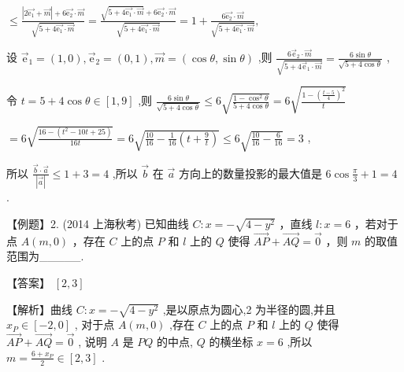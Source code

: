 \documentclass[10pt]{article}
\begin{document}
\(\leq  \frac{\left| {2\overrightarrow{{\mathrm{e}}_{1}} + \overrightarrow{m}}\right|  + 6\overrightarrow{{\mathrm{e}}_{2}} \cdot  \overrightarrow{m}}{\sqrt{5 + 4\overrightarrow{{\mathrm{e}}_{1}} \cdot  \overrightarrow{m}}} = \frac{\sqrt{5 + 4\overrightarrow{{\mathrm{e}}_{1}} \cdot  \overrightarrow{m}} + 6\overrightarrow{{\mathrm{e}}_{2}} \cdot  \overrightarrow{m}}{\sqrt{5 + 4\overrightarrow{{\mathrm{e}}_{1}} \cdot  \overrightarrow{m}}} = 1 + \frac{6\overrightarrow{{\mathrm{e}}_{2}} \cdot  \overrightarrow{m}}{\sqrt{5 + 4\overrightarrow{{\mathrm{e}}_{1}} \cdot  \overrightarrow{m}}},\)

设 \({\overrightarrow{\mathrm{e}}}_{1} = \left( {1,0}\right) ,{\overrightarrow{\mathrm{e}}}_{2} = \left( {0,1}\right) ,\overrightarrow{m} = \left( {\cos \theta ,\sin \theta }\right)\) ,则 \(\frac{6{\overrightarrow{\mathrm{e}}}_{2} \cdot  \overrightarrow{m}}{\sqrt{5 + 4{\overrightarrow{\mathrm{e}}}_{1} \cdot  \overrightarrow{m}}} = \frac{6\sin \theta }{\sqrt{5 + 4\cos \theta }}\) ,

令 \(t = 5 + 4\cos \theta  \in  \left\lbrack  {1,9}\right\rbrack\) ,则 \(\frac{6\sin \theta }{\sqrt{5 + 4\cos \theta }} \leq  6\sqrt{\frac{1 - {\cos }^{2}\theta }{5 + 4\cos \theta }} = 6\sqrt{\frac{1 - {\left( \frac{t - 5}{4}\right) }^{2}}{t}}\)

\(= 6\sqrt{\frac{{16} - \left( {{t}^{2} - {10t} + {25}}\right) }{16t}} = 6\sqrt{\frac{10}{16} - \frac{1}{16}\left( {t + \frac{9}{t}}\right) } \leq  6\sqrt{\frac{10}{16} - \frac{6}{16}} = 3\) ,

所以 \(\frac{\overrightarrow{b} \cdot  \overrightarrow{a}}{\left| \overrightarrow{a}\right| } \leq  1 + 3 = 4\) ,所以 \(\overrightarrow{b}\) 在 \(\overrightarrow{a}\) 方向上的数量投影的最大值是 \(6\cos \frac{\pi }{3} + 1 = 4\) .

【例题】2. (2014 上海秋考) 已知曲线 \(C : x =  - \sqrt{4 - {y}^{2}}\) ，直线 \(l : x = 6\) ，若对于点 \(A\left( {m,0}\right)\) ，存在 \(C\) 上的点 \(P\) 和 \(l\) 上的 \(Q\) 使得 \(\overrightarrow{AP} + \overrightarrow{AQ} = \overrightarrow{0}\) ，则 \(m\) 的取值范围为\_\_\_\_\_.

【答案】 \(\left\lbrack  {2,3}\right\rbrack\)

【解析】曲线 \(C : x =  - \sqrt{4 - {y}^{2}}\) ,是以原点为圆心,2 为半径的圆,并且 \({x}_{P} \in  \left\lbrack  {-2,0}\right\rbrack\) , 对于点 \(A\left( {m,0}\right)\) ,存在 \(C\) 上的点 \(P\) 和 \(l\) 上的 \(Q\) 使得 \(\overrightarrow{AP} + \overrightarrow{AQ} = \overrightarrow{0}\) , 说明 \(A\) 是 \({PQ}\) 的中点, \(Q\) 的横坐标 \(x = 6\) ,所以 \(m = \frac{6 + {x}_{P}}{2} \in  \left\lbrack  {2,3}\right\rbrack\) .
\end{document}
